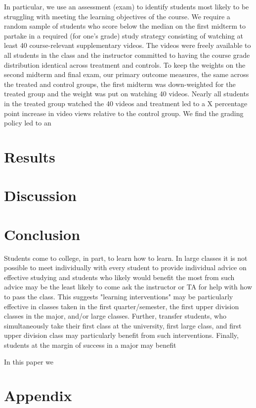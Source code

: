 \documentclass[12pt]{article}
\begin{document}
In particular, we use an assessment (exam) to identify students most likely to be struggling with meeting the learning objectives of the course. We require a random sample of students who score below the median on the first midterm to partake in a required (for one's grade) study strategy consisting of watching at least 40 course-relevant supplementary videos.  The videos were freely available to all students in the class and the instructor committed to having the course grade distribution identical across treatment and controls.  To keep the weights on the second midterm and final exam, our primary outcome measures, the same across the treated and control groups, the first midterm was down-weighted for the treated group and the weight was put on watching 40 videos. Nearly all students in the treated group watched the 40 videos and treatment led to a  X percentage point increase in video views relative to the control group. We find the grading policy led to an 


\section{Results} \label{results}


\section{Discussion} \label{discussion}


\section{Conclusion} \label{conclusion}
Students come to college, in part, to learn how to learn.  In large classes it is not possible to meet individually with every student to provide individual advice on effective studying and students who likely would benefit the most from such advice may be the least likely to come ask the instructor or TA for help with how to pass the class.  This suggests "learning interventions" may be particularly effective in classes taken in the first quarter/semester, the first upper division classes in the major, and/or large classes. Further, transfer students, who simultaneously take their first class at the university, first large class, and first upper division class may particularly benefit from such interventions.  Finally, students at the margin of success in a major may benefit 

In this paper we 



\section{Appendix}
\end{document}
